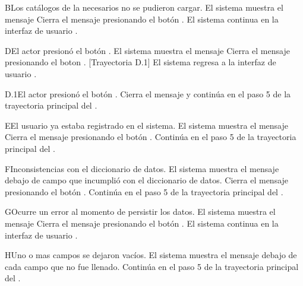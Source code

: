 \begin{UCtrayectoriaA}{B}{Los catálogos de la  necesarios no se pudieron cargar.}
	\UCpaso El sistema muestra el mensaje 
	\UCpaso[\UCactor] Cierra el mensaje presionando el botón .
	\UCpaso El sistema continua en la interfaz de usuario .
\end{UCtrayectoriaA}

\begin{UCtrayectoriaA}{D}{El actor presionó el botón .}
	\UCpaso El sistema muestra el mensaje 
	\UCpaso[\UCactor] Cierra el mensaje presionando el boton . [Trayectoria D.1]
	\UCpaso El sistema regresa a la interfaz de usuario .
\end{UCtrayectoriaA}

\begin{UCtrayectoriaA}{D.1}{El actor presionó el botón .}
	\UCpaso Cierra el mensaje y continúa en el paso 5 de la trayectoria principal del .	
\end{UCtrayectoriaA}

\begin{UCtrayectoriaA}{E}{El usuario ya estaba registrado en el sistema.}
	\UCpaso El sistema muestra el mensaje  
	\UCpaso[\UCactor] Cierra el mensaje presionando el botón .
	\UCpaso Continúa en el paso 5 de la trayectoria principal del .
\end{UCtrayectoriaA}

\begin{UCtrayectoriaA}{F}{Inconsistencias con el diccionario de datos.}
		\UCpaso El sistema muestra el mensaje  debajo de campo que incumplió con el diccionario de datos.
		\UCpaso[\UCactor] Cierra el mensaje presionando el botón .
		\UCpaso Continúa en el paso 5 de la trayectoria principal del .
	\end{UCtrayectoriaA}
	
	
	
	\begin{UCtrayectoriaA}{G}{Ocurre un error al momento de persistir los datos.}
		\UCpaso El sistema muestra el mensaje 
		\UCpaso[\UCactor] Cierra el mensaje presionando el botón .
		\UCpaso El sistema continua  en la interfaz de usuario .
	\end{UCtrayectoriaA}
	
	
	\begin{UCtrayectoriaA}{H}{Uno o mas campos se dejaron vacíos.}
		\UCpaso El sistema muestra el mensaje  debajo de cada campo que no fue llenado. 
		\UCpaso	Continúa en el paso 5 de la trayectoria principal del .
	\end{UCtrayectoriaA}
